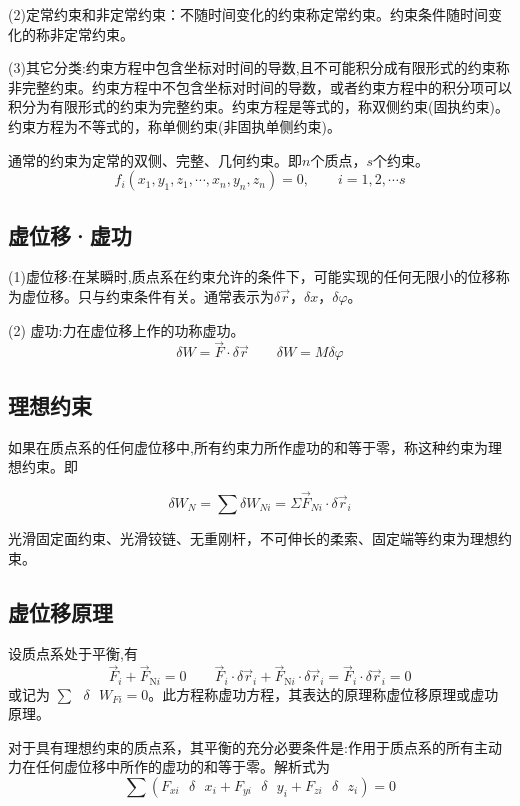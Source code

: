 (2)定常约束和非定常约束：不随时间变化的约束称定常约束。约束条件随时间变化的称非定常约束。

(3)其它分类:约束方程中包含坐标对时间的导数,且不可能积分成有限形式的约束称非完整约束。约束方程中不包含坐标对时间的导数，或者约束方程中的积分项可以积分为有限形式的约束为完整约束。约束方程是等式的，称双侧约束(固执约束)。约束方程为不等式的，称单侧约束(非固执单侧约束)。

通常的约束为定常的双侧、完整、几何约束。即$n$个质点，$s$个约束。
$$f_i(x_1,y_1,z_1,\cdots,x_n,y_n,z_n) =0, \qquad i=1,2,\cdots s $$

\subsection{虚位移·虚功}

(1)虚位移:在某瞬时,质点系在约束允许的条件下，可能实现的任何无限小的位移称为虚位移。只与约束条件有关。通常表示为$\delta \vec{r}$，$\delta x$，$\delta \varphi$。

(2) 虚功:力在虚位移上作的功称虚功。
$$\delta W = \vec{F}\cdot \delta \vec{r} \qquad \delta W = M \delta \varphi$$
\subsection{理想约束}

如果在质点系的任何虚位移中,所有约束力所作虚功的和等于零，称这种约束为理想约束。即

$$\delta W_N = \sum \delta W_{Ni} = \Sigma \vec{F}_{Ni}\cdot \delta \vec{r}_i$$

光滑固定面约束、光滑铰链、无重刚杆，不可伸长的柔索、固定端等约束为理想约束。

\subsection{虚位移原理}

设质点系处于平衡,有
$${{\vec{F}}_{i}}+{{\vec{F}}_{\text{N}i}}=0 \qquad  {{\vec{F}}_{i}} \cdot \delta  {{\vec{r}}_{i}} +{{\vec{F}}_{\text{N}i}} \cdot \delta {{\vec{r}}_{i}}={{\vec{F}}_{i}} \cdot \delta  {{\vec{r}}_{i}} = 0 $$
或记为 $ \sum{\text{ }\!\!\delta\!\!\text{ }{{W}_{Fi}}}=0 $。此方程称虚功方程，其表达的原理称虚位移原理或虚功原理。

对于具有理想约束的质点系，其平衡的充分必要条件是:作用于质点系的所有主动力在任何虚位移中所作的虚功的和等于零。解析式为
$$\sum{\left( {{F}_{xi}}\text{ }\!\!\delta\!\!\text{ }{{x}_{i}}+{{F}_{yi}}\text{ }\!\!\delta\!\!\text{ }{{y}_{i}}+{{F}_{zi}}\text{ }\!\!\delta\!\!\text{ }{{z}_{i}} \right)=0}$$

